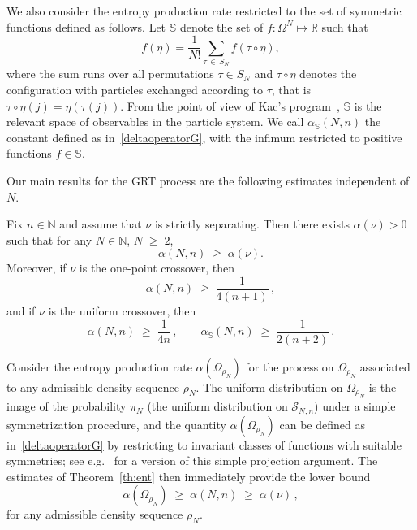 \documentclass[AHL,Unicode,longabstracts,published]{cedram}
\renewcommand{\geq}{\;\geqslant\;}
\newcommand{\cS}{\mathcal{S}}
\newcommand{\bbN}{\mathbb{N}}
\newcommand{\bbR}{\mathbb{R}}
\newcommand{\bbS}{\mathbb{S}}
\let\a=\alpha
\let\r=\rho
\let\t=\tau
\let\O=\Omega
\begin{document}
We also consider the entropy production rate restricted to the set of symmetric functions defined as follows. Let $\bbS$ denote the set of $f:\O^N\mapsto \bbR$ such that
\[
f(\eta)=\frac1{N!}\sum_{\t\,\in\,S_N} f(\t\circ\eta),
\]
where the sum runs over all permutations $\t\in S_N$ and $\t\circ\eta$ denotes the configuration with particles exchanged according to $\t$, that is $\t\circ\eta(j) = \eta(\t(j))$. From the point of view of Kac's program~\cite{KAC}, $\bbS$ is the relevant space of observables in the particle system. We call $\a_{\bbS}(N,n)$ the constant defined as in~\eqref{deltaoperatorG}, with the infimum restricted to positive functions $f\in\bbS$.

Our main results for the GRT process are the following estimates independent of~$N$.

\begin{theo}
\label{th:ent}
Fix $n\in\bbN$ and assume that $\nu$ is strictly separating. Then there exists $\a(\nu)>0$ such that for any $N\in\bbN$, $N\geq 2$,
\begin{equation}\label{entao}
\a(N,n)\geq \a(\nu).
\end{equation}
Moreover, if $\nu$ is the one-point crossover, then
\begin{equation}\label{enta}
\a(N,n)\geq \frac{1}{4(n+1)}\,,
\end{equation}
and if $\nu$ is the uniform crossover, then
\begin{equation}\label{entas}
\a(N,n)\geq \frac{1}{4n}\,,\qquad \a_\bbS(N,n)\geq \frac1{2(n+2)}\,.
\end{equation}
\end{theo}

\begin{rema}\label{rem:opt}
Consider the entropy production rate $\a(\O_{\r_N})$ for the process on $\O_{\r_N}$ associated to any admissible density sequence $\r_N$. The uniform distribution on $\O_{\r_N}$ is the image of the probability $\pi_N$ (the uniform distribution on $\cS_{N,n}$) under a simple symmetrization procedure, and the quantity $\a(\O_{\r_N})$ can be defined as in~\eqref{deltaoperatorG} by restricting to invariant classes of functions with suitable symmetries; see e.g.~\cite[Section~4.2.3]{barthe_et_al} for a version of this simple projection argument. The estimates of Theorem~\ref{th:ent} then immediately provide the lower bound
\begin{equation}\label{lowbos}
\a(\O_{\r_N})\geq \a(N,n)\geq \a(\nu)\,,
\end{equation}
for any admissible density sequence $\r_N$.
\end{rema}
\end{document}
